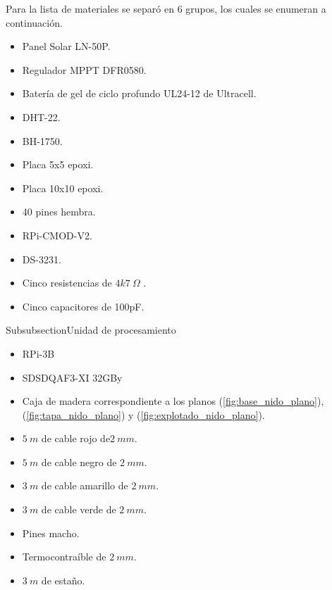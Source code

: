 Para la lista de materiales se separó en 6 grupos, los cuales se enumeran a continuación.

\begin{itemize}
	\item Panel Solar LN-50P.
	\item Regulador MPPT DFR0580.
	\item Batería de gel de ciclo profundo UL24-12 de Ultracell.
\end{itemize}

\begin{itemize}
	\item DHT-22.
	\item BH-1750.
	\item Placa 5x5 epoxi.
	\item Placa 10x10 epoxi.
	\item 40 pines hembra.
	\item RPi-CMOD-V2.
	\item DS-3231.
	\item Cinco resistencias de $4k7 \ \Omega$ .
	\item Cinco capacitores de 100pF.
\end{itemize}

Subsubsection{Unidad de procesamiento}
\begin{itemize}
	\item RPi-3B
	\item SDSDQAF3-XI 32GBy
\end{itemize}

\begin{itemize}
	\item Caja de madera correspondiente a los planos (\ref{fig:base_nido_plano}), (\ref{fig:tapa_nido_plano}) y (\ref{fig:explotado_nido_plano}).
\end{itemize}

\begin{itemize}
	\item $5 \ m$ de cable rojo de$ 2  \ mm$.
	\item $5  \ m$ de cable negro de $2  \ mm$.
	\item $3  \ m$ de cable amarillo de $2  \ mm$.
	\item $3  \ m$ de cable verde de $2  \ mm$.
	\item Pines macho.
	\item Termocontraíble de $2  \ mm$.
	\item $3  \ m$ de estaño.
\end{itemize}









